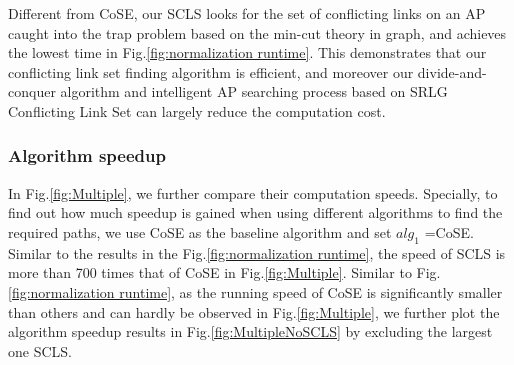 
Different from CoSE, our SCLS looks for the set of conflicting links on an AP caught into the trap problem based on the min-cut theory in graph, and achieves the lowest time in Fig.\ref{fig:normalization runtime}. This demonstrates that our conflicting link set finding algorithm is efficient, and moreover our divide-and-conquer algorithm and intelligent AP searching process based on SRLG Conflicting Link Set can largely reduce the computation cost.


\subsubsection{Algorithm speedup}

In Fig.\ref{fig:Multiple}, we further compare their computation speeds. Specially, to find out how much speedup is gained when using different algorithms to find the required paths,
we use CoSE as the baseline algorithm and set $alg_1$ =CoSE. Similar to the results in the Fig.\ref{fig:normalization runtime}, the speed of SCLS is more than 700 times that of  CoSE in Fig.\ref{fig:Multiple}.  Similar to Fig.\ref{fig:normalization runtime}, as the running speed of CoSE is significantly smaller than others and can hardly be observed in Fig.\ref{fig:Multiple}, we further plot the algorithm speedup results in Fig.\ref{fig:MultipleNoSCLS} by excluding the largest one SCLS.



